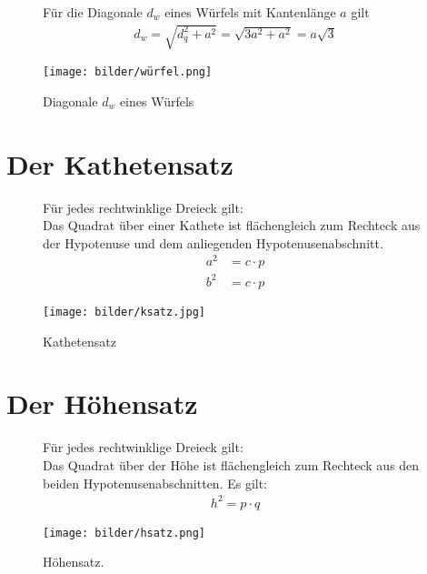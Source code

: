 \documentclass{report}
\newcommand{\x}{\cdot}
\theoremstyle{definition}
\theoremstyle{definition}
\theoremstyle{an}
\theoremstyle{lem}
\theoremstyle{def}
\theoremstyle{def}
\begin{document}
	\begin{figure}[h]
		\begin{minipage}{0.6\linewidth}
			\begin{defi}
				Für die Diagonale $d_w$ eines Würfels mit Kantenlänge $a$ gilt
				\begin{align}
					d_w=\sqrt{d_q^2+a^2}=\sqrt{3a^2+a^2}=a\sqrt{3}
				\end{align}
			\end{defi}
		\end{minipage}
		\begin{minipage}{0.3\linewidth}
			\texttt{[image: bilder/würfel.png]}
			\caption{Diagonale $d_w$ eines Würfels}
		\end{minipage}
	\end{figure}
	\pagebreak
	\section{Der Kathetensatz}
	\begin{figure}[h]
		\begin{minipage}{0.6\linewidth}
			
	\begin{defi}[Kathetensatz]
		Für jedes rechtwinklige Dreieck gilt:\\
			Das Quadrat über einer Kathete ist flächengleich zum Rechteck aus der Hypotenuse und dem anliegenden Hypotenusenabschnitt.
			\begin{align}
				a^2&=c\x p\\
				b^2&=c \x p
			\end{align}
	\end{defi}
		
		\end{minipage}
		\begin{minipage}{0.4 \linewidth}
		\texttt{[image: bilder/ksatz.jpg]}
		\caption{Kathetensatz}
		\end{minipage}
	\end{figure}
	\section{Der Höhensatz}
	\begin{figure}[h]
		\begin{minipage}{0.6\linewidth}
			\begin{defi}[Höhensatz]
				Für jedes rechtwinklige Dreieck gilt:\\
				Das Quadrat über der Höhe ist flächengleich zum Rechteck aus den beiden Hypotenusenabschnitten. 
				Es gilt: 
				\begin{align}
					h^2=p \x q
				\end{align}
			\end{defi}
		\end{minipage}
		\begin{minipage}{0.4\linewidth}
			\texttt{[image: bilder/hsatz.png]}
			\caption{Höhensatz.}
		\end{minipage}
	\end{figure}
	\newpage	
\end{document}
